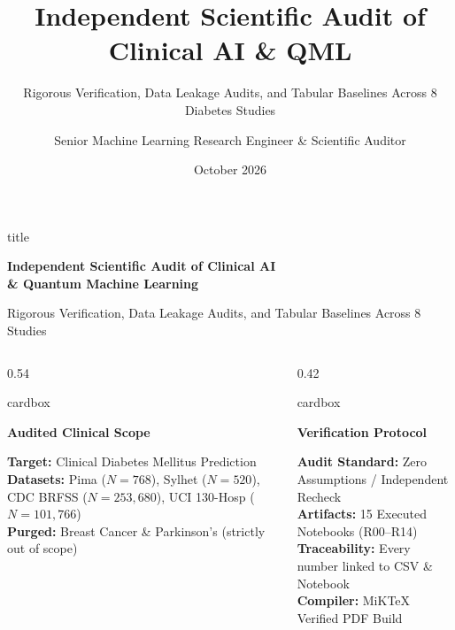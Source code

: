 \documentclass[aspectratio=169, 10pt]{beamer}
\title[Clinical AI \& QML Audit]{Independent Scientific Audit of Clinical AI \& QML}
\subtitle{Rigorous Verification, Data Leakage Audits, and Tabular Baselines Across 8 Diabetes Studies}
\author{Senior Machine Learning Research Engineer \& Scientific Auditor}
\institute{Quantum \& Clinical AI Verification Working Group}
\date{October 2026}
\newcommand{\cardbox}[3]{%
  \begin{beamercolorbox}[wd=\linewidth,rounded=true,sep=2.5pt]{cardbox}%
    {\bfseries\scriptsize\color{#1}#2\par}\vspace*{1pt}%
    {\footnotesize #3}%
  \end{beamercolorbox}%
}
\begin{document}
\begin{frame}[plain]
  \vspace*{0.2cm}
  \begin{beamercolorbox}[wd=\linewidth,rounded=true,sep=10pt]{title}
    {\huge\bfseries Independent Scientific Audit of Clinical AI\\[3pt]\& Quantum Machine Learning\par}
    \vskip 4pt
    {\large\color{LightPurple} Rigorous Verification, Data Leakage Audits, and Tabular Baselines Across 8 Studies\par}
  \end{beamercolorbox}

  \vskip 10pt

  \begin{columns}[T]
    \begin{column}{0.54\textwidth}
      \cardbox{DeepPurple}{Audited Clinical Scope}{
        \textbf{Target:} Clinical Diabetes Mellitus Prediction\\
        \textbf{Datasets:} Pima ($N=768$), Sylhet ($N=520$), CDC BRFSS ($N=253,680$), UCI 130-Hosp ($N=101,766$)\\
        \textbf{Purged:} Breast Cancer \& Parkinson's (strictly out of scope)
      }
    \end{column}

    \begin{column}{0.42\textwidth}
      \cardbox{MedPurple}{Verification Protocol}{
        \textbf{Audit Standard:} Zero Assumptions / Independent Recheck\\
        \textbf{Artifacts:} 15 Executed Notebooks (R00--R14)\\
        \textbf{Traceability:} Every number linked to CSV \& Notebook\\
        \textbf{Compiler:} MiKTeX Verified PDF Build
      }
    \end{column}
  \end{columns}
\end{frame}
\end{document}
